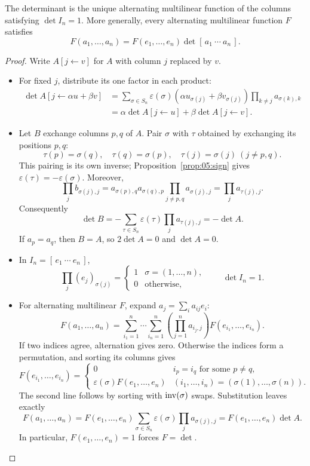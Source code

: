 \begin{theorem}\label{thm:05:characterization}
The determinant is the unique alternating multilinear function of the
columns satisfying \(\det I_n=1\).
More generally, every alternating multilinear function \(F\) satisfies
\[
F(a_1,\ldots,a_n)=F(e_1,\ldots,e_n)\det[\,a_1\ \cdots\ a_n\,].
\]
\end{theorem}
\begin{proof}
Write \(A[j\leftarrow v]\) for \(A\) with column \(j\) replaced by \(v\).
\begin{itemize}
\item For fixed \(j\), distribute its one factor in each product:
  \[
  \begin{aligned}
  \det A[j\leftarrow\alpha u+\beta v]
  &=\sum_{\sigma\in S_n}\varepsilon(\sigma)
    (\alpha u_{\sigma(j)}+\beta v_{\sigma(j)})
          \prod_{k\ne j}a_{\sigma(k),k}\\
  &=\alpha\det A[j\leftarrow u]+\beta\det A[j\leftarrow v].
  \end{aligned}
  \]
\item Let \(B\) exchange columns \(p,q\) of \(A\).
  Pair \(\sigma\) with \(\tau\) obtained by exchanging its positions \(p,q\):
  \[
  \tau(p)=\sigma(q),\quad\tau(q)=\sigma(p),\quad
  \tau(j)=\sigma(j)\ (j\ne p,q).
  \]
  This pairing is its own inverse; Proposition~\ref{prop:05:sign} gives
  \(\varepsilon(\tau)=-\varepsilon(\sigma)\). Moreover,
  \[
  \prod_j b_{\sigma(j),j}
  =a_{\sigma(p),q}a_{\sigma(q),p}\prod_{j\ne p,q}a_{\sigma(j),j}
  =\prod_j a_{\tau(j),j}.
  \]
  Consequently
  \[
  \det B=-\sum_{\tau\in S_n}\varepsilon(\tau)\prod_j a_{\tau(j),j}
        =-\det A.
  \]
  If \(a_p=a_q\), then \(B=A\), so \(2\det A=0\) and \(\det A=0\).
\item In \(I_n=[\,e_1\ \cdots\ e_n\,]\),
  \[
  \prod_j(e_j)_{\sigma(j)}=
  \begin{cases}1&\sigma=(1,\ldots,n),\\0&\text{otherwise},\end{cases}
  \qquad\det I_n=1.
  \]
\item For alternating multilinear \(F\), expand \(a_j=\sum_i a_{ij}e_i\):
  \[
  F(a_1,\ldots,a_n)=\sum_{i_1=1}^n\cdots\sum_{i_n=1}^n
    \left(\prod_{j=1}^n a_{i_j,j}\right)F(e_{i_1},\ldots,e_{i_n}).
  \]
  If two indices agree, alternation gives zero. Otherwise the indices
  form a permutation, and sorting its columns gives
  \[
  F(e_{i_1},\ldots,e_{i_n})=
  \begin{cases}
  0& i_p=i_q\text{ for some }p\ne q,\\
  \varepsilon(\sigma)F(e_1,\ldots,e_n)&(i_1,\ldots,i_n)=(\sigma(1),\ldots,\sigma(n)).
  \end{cases}
  \]
  The second line follows by sorting with \(\operatorname{inv}(\sigma)\) swaps.
  Substitution leaves exactly
  \[
  F(a_1,\ldots,a_n)
  =F(e_1,\ldots,e_n)\sum_{\sigma\in S_n}\varepsilon(\sigma)
                          \prod_j a_{\sigma(j),j}
  =F(e_1,\ldots,e_n)\det A.
  \]
  In particular, \(F(e_1,\ldots,e_n)=1\) forces \(F=\det\).
\end{itemize}
\end{proof}

